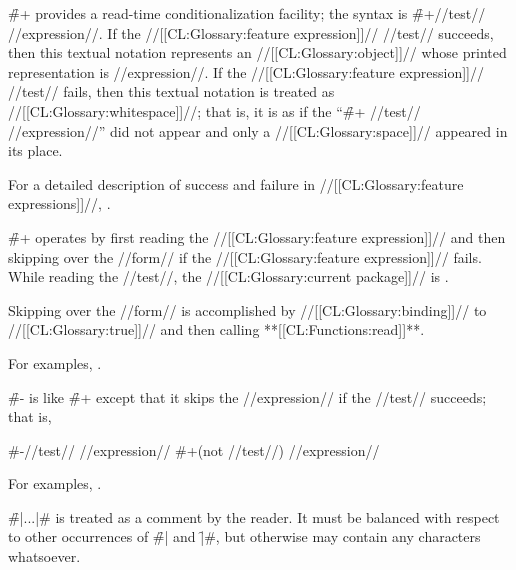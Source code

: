 \endsubsubsection%

 

\f{\#+} provides a read-time conditionalization facility; the syntax is \f{\#+//test// //expression//}. If the //[[CL:Glossary:feature expression]]// //test// succeeds, then this textual notation represents an //[[CL:Glossary:object]]//
 whose printed representation is //expression//. If the //[[CL:Glossary:feature expression]]// //test// fails, then this textual notation is treated as //[[CL:Glossary:whitespace]]//; 
 that is, it is as if the ``\f{\#+} //test// //expression//'' 
 did not appear and only a //[[CL:Glossary:space]]// appeared in its place.

For a detailed description of success and failure in //[[CL:Glossary:feature expressions]]//, \seesection\FeatureExpressions.

\f{\#+} operates by first reading the //[[CL:Glossary:feature expression]]// and then skipping over the //form// if the //[[CL:Glossary:feature expression]]// fails.  While reading the //test//, the //[[CL:Glossary:current package]]// is .

Skipping over the //form// is accomplished by //[[CL:Glossary:binding]]//   to //[[CL:Glossary:true]]// and then calling **[[CL:Functions:read]]**.

For examples, \seesection\FeatureExpExamples.

\endsubsubsection%

 

\f{\#-} is like \f{\#+}  except that it skips the //expression// if the //test// succeeds;  that is,

\code #-//test// //expression// \EQ #+(not //test//) //expression// \endcode

For examples, \seesection\FeatureExpExamples.

\endsubsubsection%

 

\f{\#|...|\#} is treated as a comment by the reader. It must be balanced with respect to other occurrences of \f{\#|} and \f{|\#}, but otherwise may contain any characters whatsoever.

